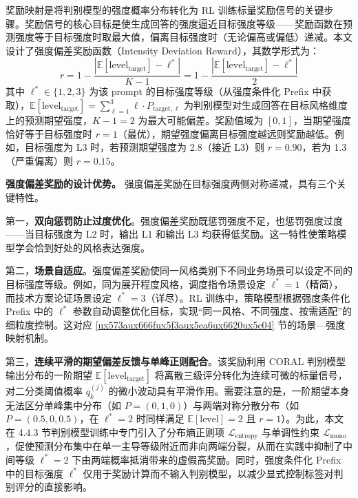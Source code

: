 \documentclass[fontset=fandol,type=master,campus=shenzhen,etitleauto=true]{hithesisbook}
\begin{document}
奖励映射是将判别模型的强度概率分布转化为 RL 训练标量奖励信号的关键步骤。奖励信号的核心目标是使生成回答的强度逼近目标强度等级------奖励函数在预测强度等于目标强度时取最大值，偏离目标强度时（无论偏高或偏低）递减。本文设计了强度偏差奖励函数（Intensity Deviation Reward），其数学形式为：
\begin{equation}
r = 1 - \frac{|\mathbb{E}[\text{level}_{\text{target}}] - \ell^*|}{K-1} = 1 - \frac{|\mathbb{E}[\text{level}_{\text{target}}] - \ell^*|}{2}
\end{equation}
其中 $\ell^* \in \{1,2,3\}$ 为该 prompt 的目标强度等级（从强度条件化 Prefix 中获取），$\mathbb{E}[\text{level}_{\text{target}}] = \sum_{\ell=1}^{3} \ell \cdot P_{\text{target},\ell}$ 为判别模型对生成回答在目标风格维度上的预测期望强度，$K-1 = 2$ 为最大可能偏差。奖励值域为 $[0, 1]$，当期望强度恰好等于目标强度时 $r = 1$（最优），期望强度偏离目标强度越远则奖励越低。例如，目标强度为 L3 时，若预测期望强度为 2.8（接近 L3）则 $r = 0.90$，若为 1.3（严重偏离）则 $r = 0.15$。

\textbf{强度偏差奖励的设计优势。} 强度偏差奖励在目标强度两侧对称递减，具有三个关键特性。

第一，\textbf{双向惩罚防止过度优化}。强度偏差奖励既惩罚强度不足，也惩罚强度过度------当目标强度为 L2 时，输出 L1 和输出 L3 均获得低奖励。这一特性使策略模型学会恰到好处的风格表达强度。

第二，\textbf{场景自适应}。强度偏差奖励使同一风格类别下不同业务场景可以设定不同的目标强度等级。例如，同为展开程度风格，调度指令场景设定 $\ell^* = 1$（精简），而技术方案论证场景设定 $\ell^* = 3$（详尽）。RL 训练中，策略模型根据强度条件化 Prefix 中的 $\ell^*$ 参数自动调整优化目标，实现``同一风格、不同强度、按需适配''的细粒度控制。这对应 \ref{ux573aux666fux5f3aux5ea6ux6620ux5c04} 节的场景---强度映射机制。

第三，\textbf{连续平滑的期望偏差反馈与单峰正则配合}。该奖励利用 CORAL 判别模型输出分布的一阶期望 $\mathbb{E}[\text{level}_{\text{target}}]$ 将离散三级评分转化为连续可微的标量信号，对二分类阈值概率 $q_k^{(j)}$ 的微小波动具有平滑作用。需要注意的是，一阶期望本身无法区分单峰集中分布（如 $P=(0,1,0)$）与两端对称分散分布（如 $P=(0.5,0,0.5)$，在 $\ell^*=2$ 时同样满足 $\mathbb{E}[\text{level}]=2$ 且 $r=1$）。为此，本文在 4.4.3 节判别模型训练中专门引入了分布熵正则项 $\mathcal{L}_{\text{entropy}}$ 与单调性约束 $\mathcal{L}_{\text{mono}}$，促使预测分布集中在单一主导等级附近而非向两端分裂，从而在实践中抑制了中间等级 $\ell^*=2$ 下由两端概率抵消带来的虚假高奖励。同时，强度条件化 Prefix 中的目标强度 $\ell^*$ 仅用于奖励计算而不输入判别模型，以减少显式控制标签对判别评分的直接影响。
\end{document}
